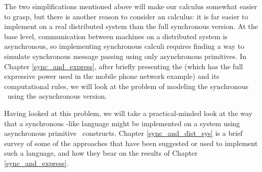 The two simplifications mentioned above will make our calculus somewhat easier to grasp, but there is another reason to consider an  calculus: it is far easier to implement on a real distributed system than the full synchronous version.  At the base level, communication between machines on a distributed system is asynchronous, so implementing synchronous calculi requires finding a way to simulate synchronous message passing using only asynchronous primitives.  In Chapter \ref{sync_and_express}, after briefly presenting the  \picalc (which has the full expressive power used in the mobile phone network example) and its computational rules, we will look at the problem of modeling the synchronous \picalc\ using the asynchronous version.

Having looked at this problem, we will take a practical-minded look at the way that a synchronous \picalc-like language might be implemented on a system using asynchronous primitive \picalc\ constructs. Chapter \ref{sync_and_dist_sys} is a brief survey of some of the approaches that have been suggested or used to implement such a language, and how they bear on the results of Chapter \ref{sync_and_express}.